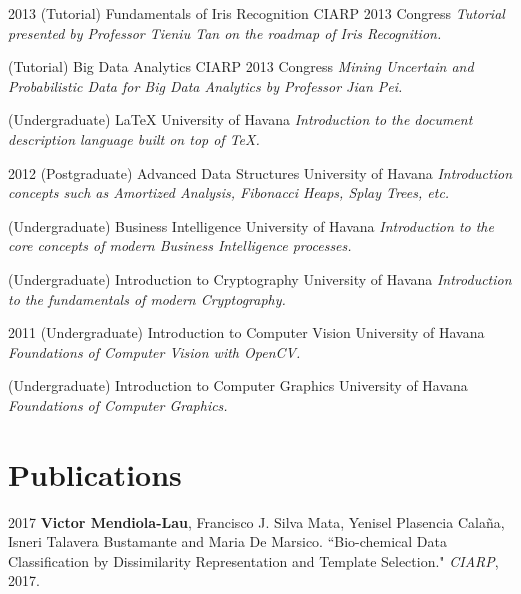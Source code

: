 \documentclass[]{friggeri-cv}
\begin{document}
\begin{entrylist}    
  \entry
    {2013}
    {(Tutorial) Fundamentals of Iris Recognition}
    {CIARP 2013 Congress}
    {\emph{Tutorial presented by Professor Tieniu Tan on the roadmap of Iris Recognition.}}

  \entry
    {}
    {(Tutorial) Big Data Analytics}
    {CIARP 2013 Congress}
    {\emph{Mining Uncertain and Probabilistic Data for Big Data Analytics by Professor Jian Pei.}}
    
  \entry
    {}
    {(Undergraduate) \LaTeX}
    {University of Havana}
    {\emph{Introduction to the document description language built on top of \TeX.}}
\end{entrylist}
       
\begin{entrylist}
  \entry
    {2012}
    {(Postgraduate) Advanced Data Structures}
    {University of Havana}
    {\emph{Introduction concepts such as Amortized Analysis, Fibonacci Heaps, Splay Trees, etc.}}      

  \entry
    {}
    {(Undergraduate) Business Intelligence}
    {University of Havana}
    {\emph{Introduction to the core concepts of modern Business Intelligence processes.}}

  \entry
    {}
    {(Undergraduate) Introduction to Cryptography}
    {University of Havana}
    {\emph{Introduction to the fundamentals of modern Cryptography.}}
\end{entrylist}

\begin{entrylist}
  \entry
    {2011}
    {(Undergraduate) Introduction to Computer Vision}
    {University of Havana}
    {\emph{Foundations of Computer Vision with OpenCV.}}      

  \entry
    {}
    {(Undergraduate) Introduction to Computer Graphics}
    {University of Havana}
    {\emph{Foundations of Computer Graphics.}}
\end{entrylist}

\pagebreak

\section{Publications}
\begin{paperlist}
  \paperentry
    {2017}
    {}
    {}
    {
		\textbf{Victor Mendiola-Lau}, Francisco J. Silva Mata, Yenisel Plasencia Calaña, Isneri Talavera Bustamante and Maria De Marsico. ``Bio-chemical Data Classification by Dissimilarity Representation and Template Selection." \emph{CIARP}, 2017.
    }
\end{paperlist}
\end{document}
